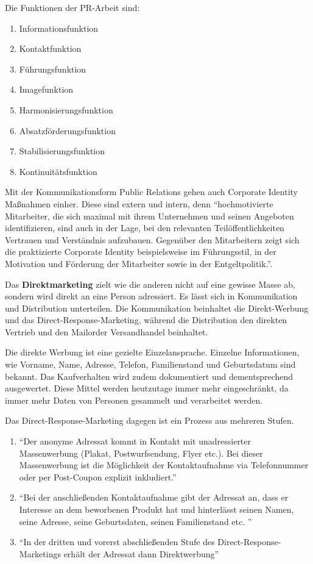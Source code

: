 Die Funktionen der PR-Arbeit sind:

\begin{enumerate}
	\item Informationsfunktion 
	\item Kontaktfunktion  
	\item Führungsfunktion  
	\item Imagefunktion  
	\item Harmonisierungsfunktion 
	\item Absatzförderungsfunktion  
	\item Stabilisierungsfunktion  
	\item Kontinuitätsfunktion  
\end{enumerate}

Mit der Kommunikationsform Public Relations gehen auch Corporate Identity Maßnahmen einher. Diese sind extern und intern, denn \enquote{hochmotivierte  Mitarbeiter,  die  sich  maximal  mit  ihrem  Unternehmen  und  seinen Angeboten  identifizieren,  sind  auch  in  der  Lage,  bei  den  relevanten  Teilöffentlichkeiten  Vertrauen  und  Verständnis  aufzubauen.  Gegenüber  den  Mitarbeitern  zeigt sich  die  praktizierte  Corporate Identity  beispielsweise  im  Führungsstil,  in  der  Motivation  und  Förderung der Mitarbeiter sowie in der Entgeltpolitik.}.

Das \textbf{Direktmarketing} zielt wie die anderen nicht auf eine gewisse Masse ab, sondern wird direkt an eine Person adressiert. Es lässt sich in Kommunikation und Distribution unterteilen. Die Kommunikation beinhaltet die Direkt-Werbung und das Direct-Response-Marketing, während die Distribution den direkten Vertrieb und den Mailorder Versandhandel beinhaltet. 

Die direkte Werbung ist eine gezielte Einzelansprache. Einzelne Informationen, wie Vorname, Name, Adresse, Telefon, Familienstand und Geburtsdatum sind bekannt. Das Kaufverhalten wird zudem dokumentiert und dementsprechend ausgewertet. Diese Mittel werden heutzutage immer mehr eingeschränkt, da immer mehr Daten von Personen gesammelt und verarbeitet werden.

Das Direct-Response-Marketing dagegen ist ein Prozess aus mehreren Stufen.

\begin{enumerate}
	\item \enquote{Der anonyme Adressat kommt in Kontakt mit unadressierter Massenwerbung (Plakat, Postwurfsendung, Flyer etc.). Bei dieser Massenwerbung ist die Möglichkeit der Kontaktaufnahme via Telefonnummer oder per Post-Coupon explizit inkludiert.}
	\item \enquote{Bei der anschließenden Kontaktaufnahme gibt der Adressat an, dass er Interesse an dem beworbenen Produkt hat und hinterlässt seinen Namen, seine Adresse, seine Geburtsdaten, seinen Familienstand etc. }  
	\item \enquote{In der dritten und vorerst abschließenden Stufe des  Direct-Response-Marketings erhält der Adressat dann Direktwerbung}  
\end{enumerate}



